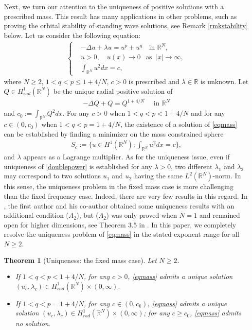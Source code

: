 \documentclass{article}
\newtheorem{theorem}{Theorem}[section]
\theoremstyle{definition} \theoremstyle{remark}
\numberwithin{equation}{section}
\newcommand{\R}{\mathbb{R}}
\newcommand{\la}{\lambda}
\begin{document}
		\medbreak
		Next, we turn our attention to the uniqueness of positive solutions with a prescribed mass. This result has many applications in other problems, such as proving the orbital stability of standing wave solutions, see Remark \ref{rmkstability} below. Let us consider the following equation:
		\begin{align} \label{eqmass}
		\left\{
			\begin{aligned}
				& -\Delta u + \la u = u^{p} + u^{q} \quad \text{in } \R^N, \\
				& u > 0, \quad u(x) \to 0 ~~\text{ as }~ |x| \to \infty, \\
				& \int_{\R^N}u^2dx = c,
			\end{aligned}
		\right.
	\end{align}
	where $N \ge 2$, $1 < q < p \le 1 + 4/N$, $c > 0$ is prescribed and $\la \in \R$ is unknown. Let $Q \in H^1_{rad}(\R^N)$ be the unique radial positive solution of
	\begin{align*}
		-\Delta Q + Q = Q^{1 + 4/N} \quad \text{ in } \R^N
	\end{align*}
	and $c_0 := \int_{\R^N}Q^2dx$. For any $c > 0$ when $1 < q < p < 1 + 4/N$ and for any $c \in (0,c_0)$ when $1 < q < p = 1 + 4/N$, the existence of a solution of \eqref{eqmass} can be established by finding a minimizer on the mass constrained sphere
	\begin{align*}
		S_c := \big\{u \in H^1(\R^N): \int_{\R^N}u^2dx = c \big\},
	\end{align*}
	and $\la$ appears as a Lagrange multiplier. As for the uniqueness issue, even if uniqueness of \eqref{doublepower} is established for any $\la > 0$, two different $\la_1$ and $\la_2$ may correspond to two solutions $u_1$ and $u_2$ having the same $L^2(\R^N)$-norm. In this sense, the uniqueness problem in the fixed mass case is more challenging than the fixed frequency case. Indeed, there are very few results in this regard. In \cite{HS2}, the first author and his co-author obtained some uniqueness results with an additional condition ($A_2$), but ($A_2$) was only proved when $N=1$ and remained open for higher dimensions, see Theorem 3.5 in \cite{HS2}. In this paper, we completely resolve the uniqueness problem of \eqref{eqmass} in the stated exponent range for all $N \ge 2$.

	\begin{theorem}[Uniqueness: the fixed mass case] \label{thmmain2}
		Let $N \ge 2$.
		\begin{itemize}
			\item If $1 < q < p < 1 + 4/N$, for any $c > 0$, \eqref{eqmass} admits a unique solution $(u_c,\la_c) \in H^1_{rad}(\R^N) \times (0,\infty)$.
			\item If $1 < q < p = 1 + 4/N$, for any $c \in (0,c_0)$, \eqref{eqmass} admits a unique solution $(u_c,\la_c) \in H^1_{rad}(\R^N) \times (0,\infty)$; for any $c \ge c_0$, \eqref{eqmass} admits no solution.
		\end{itemize}	
	\end{theorem}
\end{document}
